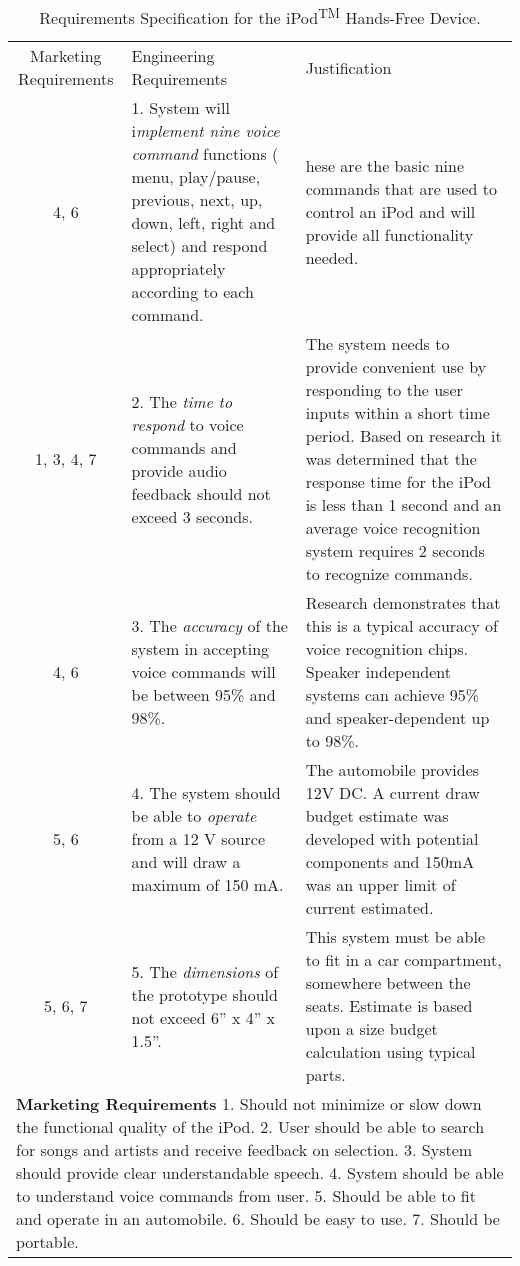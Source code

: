 \begin{table}
\centering
\caption{Requirements Specification for the
iPod\textsuperscript{TM} Hands-Free Device.}
\label{table:ipod}

\begin{tabular}{ |c|l|l|} 
\hline
\rowcolor{Gray}
Marketing Requirements & Engineering Requirements & Justification \\

4, 6 & 
1.  System will i\emph{mplement nine voice command} functions ( menu,
  play/pause, previous, next, up, down, left, right and select) and
  respond appropriately according to each command. &
  hese are the basic nine commands that are used to
control an iPod and will provide all functionality needed. \\

1, 3, 4, 7 & 
2.   The \emph{time to respond} to voice commands and provide audio
  feedback should not exceed 3 seconds. &
The system needs to provide convenient use by
responding to the user inputs within a short time period. Based on
research it was determined that the response time for the iPod is less
than 1 second and an average voice recognition system requires 2 seconds
to recognize commands. \\

4, 6 & 
3.   The \emph{accuracy} of the system in accepting voice commands will be
  between 95\% and 98\%. &
Research demonstrates that this is a typical accuracy
of voice recognition chips. Speaker independent systems can achieve 95\%
and speaker-dependent up to 98\%. \\

5, 6 & 
4.   The system should be able to \emph{operate} from a 12 V source and
  will draw a maximum of 150 mA. &
The automobile provides 12V DC. A current draw budget
estimate was developed with potential components and 150mA was an upper
limit of current estimated. \\

5, 6, 7 & 
5.  The \emph{dimensions} of the prototype should not exceed 6'' x 4'' x  1.5''. &
This system must be able to fit in a car compartment,
somewhere between the seats. Estimate is based upon a size budget
calculation using typical parts. \\

\multicolumn{3}{l}{
\textbf{Marketing Requirements}
1. Should not minimize or slow down the functional quality of the iPod.
2.  User should be able to search for songs and artists and receive feedback on selection.
3.  System should provide clear understandable speech.
4.  System should be able to understand voice commands from user.
5.  Should be able to fit and operate in an automobile.
6.  Should be easy to use.
7.  Should be portable.
}
\end{tabular}
\end{table}

